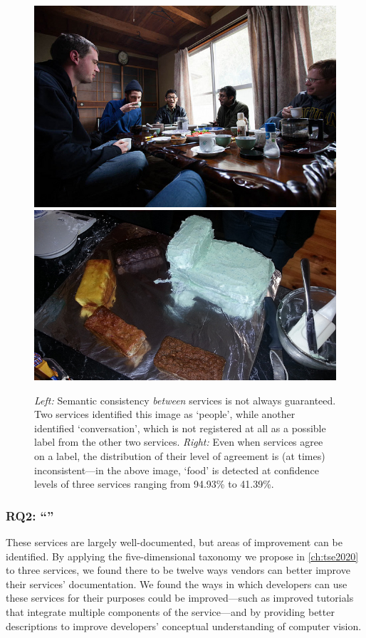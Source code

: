 \begin{figure}[h]
    \centering
    \includegraphics[width=0.45\linewidth]{mainmatter/publications/figures/icsme2019/000000009590.jpg}
    \hfill
    \includegraphics[width=0.45\linewidth]{mainmatter/publications/figures/icsme2019/000000095707.jpg}
    \caption[Results from computer vision services can be disparate and non-static]{\textit{Left:} Semantic consistency \textit{between} services is not always guaranteed. Two services identified this image as `people', while another identified `conversation', which is not registered at all as a possible label from the other two services. \textit{Right:} Even when services agree on a label, the distribution of their level of agreement is (at times) inconsistent---in the above image, `food' is detected at confidence levels of three services ranging from 94.93\% to 41.39\%.}
    \label{fig:conclusion:consistency}
\end{figure}

\subsubsection[Answering RQ2]{RQ2: ``\RQTwoTextDocumentation{}''}
\begin{callout}
These services are largely well-documented, but areas of improvement can be identified. By applying the five-dimensional taxonomy we propose in \cref{ch:tse2020} to three services, we found there to be  twelve ways vendors can better improve their services' documentation. We found the ways in which developers can use these services for their purposes could be improved---such as improved tutorials that integrate \textup{multiple} components of the service---and by providing better descriptions to improve developers' conceptual understanding of computer vision.
\end{callout}


